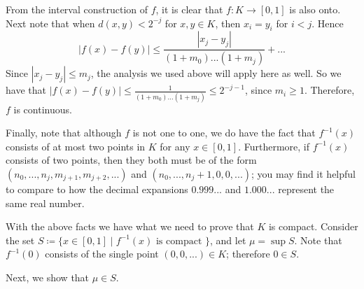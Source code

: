 From the interval construction of \(f\), it is clear that \(f: K \to [0, 1]\) is also onto. Next note that
when \(d(x, y) < 2^{-j}\) for \(x,y \in K\), then \(x_i = y_i\) for \(i < j\). Hence
\begin{equation}
|f(x) - f(y)| \leq \frac{|x_j - y_j|}{(1 + m_0)...(1 + m_j)} + ...
\end{equation} 
Since \(|x_j - y_j| \leq m_j\), the analysis we used above will apply here as well. So we have that
\(|f(x) - f(y)| \leq \frac{1}{(1 + m_0)...(1 + m_j)} \leq 2^{-j-1}\), since \(m_i \geq 1\). Therefore,
\(f\) is continuous.

Finally, note that although \(f\) is not one to one, we do have the fact that \(f^{-1}(x)\) consists of at most
two points in \(K\) for any \(x \in [0, 1]\). Furthermore, if \(f^{-1}(x)\) consists of two points, then
they both must be of the form
\((n_0, ..., n_j, m_{j+1}, m_{j+2}, ...)\) and \((n_0, ..., n_j + 1, 0, 0, ...)\);
you may find it helpful to compare to how the decimal expansions \(0.999...\) and \(1.000...\)
represent the same real number.

With the above facts we have what we need to prove that \(K\) is compact. Consider the set
\(S \coloneqq \{x \in [0, 1] \mid f^{-1}(x) \text{ is compact }\}\), and let \(\mu = \sup S\). Note that
\(f^{-1}(0)\) consists of the single point \((0,0,...)\in K\); therefore \(0 \in S\). 

Next, we show that \(\mu \in S\).
